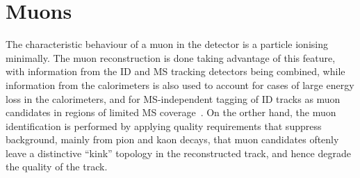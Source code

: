 





\section{Muons}
The characteristic behaviour of a muon in the detector is a particle
ionising minimally. 
The muon reconstruction is done taking advantage of this feature, 
with information from the ID and MS tracking detectors being combined, 
while information from the calorimeters is also used
to account for cases of
large energy loss in the calorimeters, and for MS-independent
tagging of ID tracks as muon candidates in regions of limited MS
coverage~\cite{CERN-EP-2020-199}.
On the orther hand, 
the muon identification is performed by applying 
quality requirements that suppress background, 
mainly from pion and kaon decays, that 
muon candidates oftenly leave a distinctive “kink” topology 
in the reconstructed track, and hence degrade the quality of the track. 



